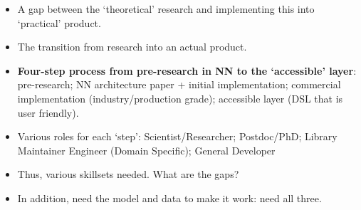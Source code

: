\begin{itemize}
  \item A gap between the `theoretical' research and implementing this into `practical' product.
  \item The transition from research into an actual product.
  \item \textbf{Four-step process from pre-research in NN to the `accessible' layer}: pre-research; NN architecture paper + initial implementation; commercial implementation (industry/production grade); accessible layer (DSL that is user friendly).
  \item Various roles for each `step': Scientist/Researcher; Postdoc/PhD; Library Maintainer Engineer (Domain Specific); General Developer
  \item Thus, various skillsets needed. What are the gaps?
  \item In addition, need the model and data to make it work: need all three.
\end{itemize}